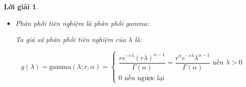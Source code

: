 \documentclass[14pt, a4paper]{article}
\theoremstyle{sltheorem}
\theoremstyle{soltheorem}
\newtheorem*{loigiai}{Lời giải}
\begin{document}
\begin{loigiai}
\begin{enumerate}
\begin{itemize}
            Nếu $\hat{\lambda}$ được tính theo mode của phân phối hậu nghiệm,
            ta gọi ước lượng này là $\hat{\lambda}_2$:

            \begin{equation*}
                \hat{\lambda}_2 = \dfrac{(\sum_{i=1}^n x_i) + 1 - 1}{n} = \dfrac{\sum_{i=1}^n x_i}{n}
            \end{equation*}

            Ta tính bias của $\hat{\lambda}_2$:

            \begin{equation*}
                \text{bias}(\hat{\lambda}_2) = \mathbb{E} \lbrack \hat{\lambda}_2 \rbrack - \lambda = \dfrac{n\lambda}{n} - \lambda = 0
            \end{equation*}

            Như vậy $\lambda$ được ước lượng theo mode của phân phối hậu nghiệm là ước lượng không chệch của $\lambda$.

            Ta tính phương sai của $\hat{\lambda}_2$:

            \begin{equation*}
                \text{Var}(\hat{\lambda}_2) = \dfrac{\lambda}{n}
            \end{equation*}

            Như vậy sai số trung bình của ước lượng $\hat{\lambda}_2$:

            \begin{equation*}
                \text{MS}(\hat{\lambda}_2) = \text{Var}(\hat{\lambda}_2) + (\text{bias}(\hat{\lambda}_2))^2 = \dfrac{\lambda}{n} < \dfrac{\lambda}{n} + \dfrac{1}{n^2}
            \end{equation*}

            Như vậy ta thấy ước lượng $\lambda$ được ước lượng theo mode của phân phối hậu nghiệm vừa là ước lượng không chệch và là ước lượng hiệu quả hơn khi $\lambda$ được ước lượng theo trung bình của phân phối hậu nghiệm.
            Nên đối với ước lượng điểm, ta sẽ chọn ước lượng theo mode của phân phối hậu nghiệm.

            \item Phân phối tiên nghiệm là phân phối gamma:
            
            Ta giả sử phân phối tiên nghiệm của $\lambda$ là:

            \begin{equation*}
                g(\lambda) = \text{gamma}(\lambda; r, \alpha) = \begin{cases}
                    \dfrac{r e^{-r\lambda} (r\lambda)^{\alpha - 1}}{\Gamma(\alpha)}=\dfrac{r^{\alpha}e^{-r\lambda} \lambda^{\alpha - 1}}{\Gamma(\alpha)} \text{ nếu } \lambda > 0 \\
                    0 \text{ nếu ngược lại}
                \end{cases}
            \end{equation*}


\end{itemize}
\end{enumerate}
\end{loigiai}
\end{document}
